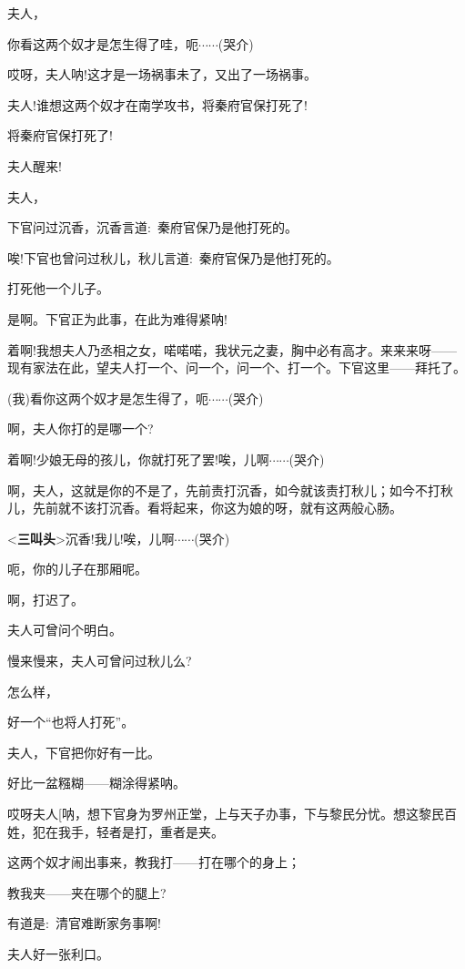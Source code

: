 {{夫人，}

{你看这两个奴才是怎生得了哇，呃$\cdots{}\cdots{}$({\hwfs 哭介})}

{哎呀，夫人{\footnotesize 呐}!这才是一场祸事未了，又出了一场祸事。}

{夫人!谁想这两个奴才在南学攻书，将秦府官保打死了!}

{将秦府官保打死了!}

{夫人醒来!}

{夫人，}

{下官问过沉香，沉香言道:~秦府官保乃是他打死的。}

{唉!下官也曾问过秋儿，秋儿言道:~秦府官保乃是他打死的。}

{打死他一个儿子。}

{是啊。下官正为此事，在此为难得紧呐!}

{着啊!我想夫人乃丞相之女，喏喏喏，我状元之妻，胸中必有高才。来来来呀------现有家法在此，望夫人打一个、问一个，问一个、打一个。下官这里------拜托了。}

{(我)看你这两个奴才是怎生得了，呃$\cdots{}\cdots{}$({\hwfs 哭介})}

{啊，夫人你打的是哪一个?}

{着啊!少娘无母的孩儿，你就打死了罢!唉，儿啊$\cdots{}\cdots{}$({\hwfs 哭介})}

{啊，夫人，这就是你的不是了，先前责打沉香，如今就该责打秋儿；如今不打秋儿，先前就不该打沉香。看将起来，你这为娘的呀，就有这两般心肠。}

{\textless{}{\!\bfseries\akai 三叫头}\!\textgreater{}沉香!我儿!唉，儿啊$\cdots{}\cdots{}$({\hwfs 哭介})}

{呃，你的儿子在那厢呢。}

{啊，打迟了。}

{夫人可曾问个明白。}

{慢来慢来，夫人可曾问过秋儿么?}

{怎么样，}

{好一个``也将人打死''。}

{夫人，下官把你好有一比。}

{好比一盆糨糊------糊涂得紧呐。}

{哎呀夫人[\footnotesize 呐}，想下官身为罗州正堂，上与天子办事，下与黎民分忧。想这黎民百姓，犯在我手，轻者是打，重者是夹。}

{这两个奴才闹出事来，教我打------打在哪个的身上；}

{教我夹------夹在哪个的腿上?}

{有道是:~清官难断家务事啊!}

{夫人好一张利口。}

